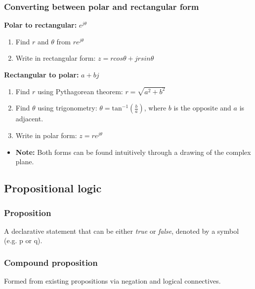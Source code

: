     \subsubsection{Converting between polar and rectangular form}
    \begin{process}

        \textbf{Polar to rectangular:} $e^{j\theta}$
        \begin{enumerate}
            \item Find $r$ and $\theta$ from $re^{j\theta}$
            \item Write in rectangular form: $z=rcos\theta + jrsin\theta$
        \end{enumerate}

        \textbf{Rectangular to polar:} $a+bj$
        \begin{enumerate}
            \item Find $r$ using Pythagorean theorem: $r = \sqrt{a^2 + b^2}$
            \item Find $\theta$ using trigonometry: $\theta = \text{tan}^{-1} \left(\frac{b}{a}\right)$, where $b$ is the opposite and $a$ is adjacent.
            \item Write in polar form: $z=re^{j\theta}$
        \end{enumerate}
        \begin{itemize}
            \item \textbf{Note:} Both forms can be found intuitively through a drawing of the complex plane. 
        \end{itemize}
    \end{process}

\subsection{Propositional logic}
    \subsubsection{Proposition}
    \begin{definition}
        A declarative statement that can be either \emph{true} or \emph{false}, denoted by a symbol (e.g. p or q).
    \end{definition}

    \subsubsection{Compound proposition}
    \begin{definition}
        Formed from existing propositions via negation and logical connectives.
    \end{definition}

